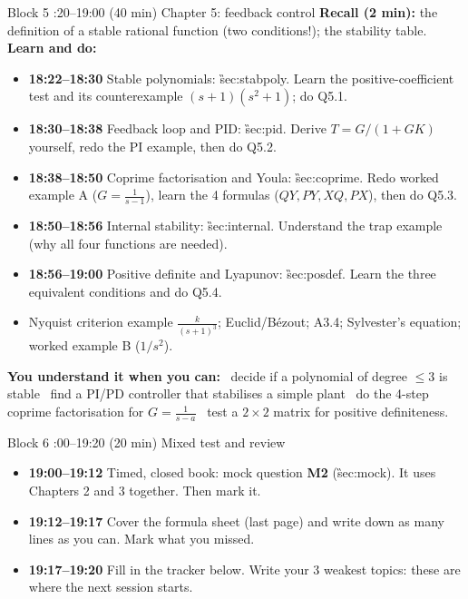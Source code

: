 \begin{sessionbox}{Block 5 :20--19:00 (40 min) \quad Chapter 5: feedback control}
\textbf{Recall (2 min):} the definition of a stable rational function (two conditions!); the stability table.\\
\textbf{Learn and do:}
\begin{itemize}
\item[\core] \textbf{18:22--18:30} Stable polynomials: \G{sec:stabpoly}. Learn the positive-coefficient test and its counterexample $(s+1)(s^2+1)$; do Q5.1.
\item[\core] \textbf{18:30--18:38} Feedback loop and PID: \G{sec:pid}. Derive $T=G/(1+GK)$ yourself, redo the PI example, then do Q5.2.
\item[\core] \textbf{18:38--18:50} Coprime factorisation and Youla: \G{sec:coprime}. Redo worked example A ($G=\frac1{s-1}$), learn the 4 formulas ($QY, PY, XQ, PX$), then do Q5.3.
\item[\core] \textbf{18:50--18:56} Internal stability: \G{sec:internal}. Understand the trap example (why all four functions are needed).
\item[\core] \textbf{18:56--19:00} Positive definite and Lyapunov: \G{sec:posdef}. Learn the three equivalent conditions and do Q5.4.
\item[\extra] Nyquist criterion example $\frac{k}{(s+1)^3}$; Euclid/B\'ezout; A3.4; Sylvester's equation; worked example B ($1/s^2$).
\end{itemize}
\textbf{You understand it when you can:}
\tick\ decide if a polynomial of degree $\le3$ is stable \quad
\tick\ find a PI/PD controller that stabilises a simple plant \quad
\tick\ do the 4-step coprime factorisation for $G=\frac1{s-a}$ \quad
\tick\ test a $2\times2$ matrix for positive definiteness.
\end{sessionbox}

\begin{sessionbox}{Block 6 :00--19:20 (20 min) \quad Mixed test and review}
\begin{itemize}
\item[\core] \textbf{19:00--19:12} Timed, closed book: mock question \textbf{M2} (\G{sec:mock}). It uses Chapters 2 and 3 together. Then mark it.
\item[\core] \textbf{19:12--19:17} Cover the formula sheet (last page) and write down as many lines as you can. Mark what you missed.
\item[\core] \textbf{19:17--19:20} Fill in the tracker below. Write your 3 weakest topics: these are where the next session starts.
\end{itemize}
\end{sessionbox}

